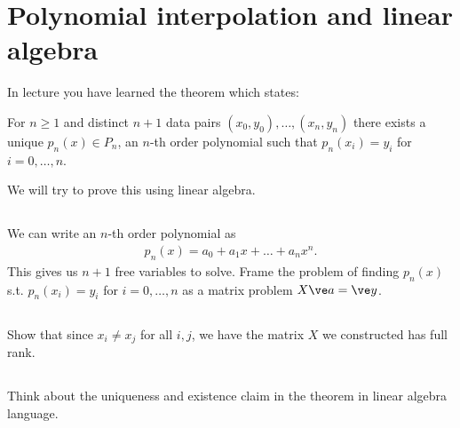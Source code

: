 \documentclass[11pt,letterpaper]{report}
\begin{document}
\section{Polynomial interpolation and linear algebra}
In lecture you have learned the theorem which states:

For $n\geq 1$ and distinct $n+1$ data pairs $(x_0,y_0),\dots,(x_n,y_n)$ there exists a unique $p_n(x)\in P_n$, an $n$-th order polynomial such that $p_n(x_i) = y_i$ for $i = 0,\dots,n$. 

We will try to prove this using linear algebra.

\subsection{}
We can write an $n$-th order polynomial as
\begin{align*}
    p_n(x) = a_0 + a_1x + \dots + a_nx^n.
\end{align*}
This gives us $n+1$ free variables to solve. Frame the problem of finding $p_n(x)$ s.t. $p_n(x_i) = y_i$ for $i = 0,\dots,n$ as a matrix problem $X\ve a = \ve y$.

\subsection{}
Show that since $x_i\neq x_j$ for all $i,j$, we have the matrix $X$ we constructed has full rank. 

\subsection{}
Think about the uniqueness and existence claim in the theorem in linear algebra language. 


\newpage


\end{document}
